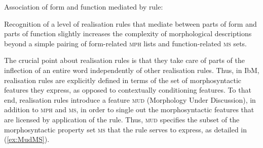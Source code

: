 \documentclass[output=paper
	        ,collection
	        ,collectionchapter
 	        ,biblatex
                ,babelshorthands
                ,newtxmath
                ,draftmode
                ,colorlinks, citecolor=brown
]{langscibook}
\begin{document}
\begin{exe}
\begin{xlist}
\eas
\label{fig:WordRR}
Association of form and function mediated by rule:\\
%
%
%
\zs

Recognition of a level of realisation rules that mediate between parts
of form and parts of function slightly increases the complexity of
morphological descriptions beyond a simple pairing of form-related
\textsc{mph} lists and function-related \textsc{ms} sets. 

The crucial point about realisation rules is that they take care of
parts of the inflection of an entire word independently of other
realisation rules. Thus, in IbM, realisation rules are explicitly
defined in terms of the set of morphosyntactic features they express,
as opposed to contextually conditioning features. To that end, realisation
rules introduce a feature \textsc{mud} (Morphology Under Discussion),
in addition to \textsc{mph} and \textsc{ms}, in order to single out
the morphosyntactic features that are licensed by application of the
rule. Thus, \textsc{mud} specifies the subset of the morphosyntactic
property set \textsc{ms} that the rule serves to express, as detailed
in (\ref{ex:MudMS}). 


\end{xlist}
\end{exe}
\end{document}
